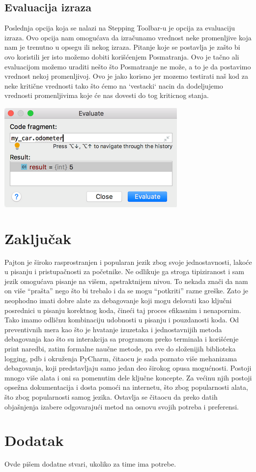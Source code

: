 \documentclass[a4paper]{article}
\begin{document}
\subsection{Evaluacija izraza}
Poslednja opcija koja se nalazi na Stepping Toolbar-u je opcija za evaluaciju izraza. Ovo opcija nam omogućava da izračunamo vrednost neke promenljive koja nam je trenutno u opsegu ili nekog izraza\cite{pyCharm}. Pitanje koje se postavlja je zašto bi ovo koristili jer isto možemo dobiti korišćenjem Posmatranja. Ovo je tačno ali evaluacijom možemo uraditi nešto što Posmatranje ne može, a to je da postavimo vrednost nekoj promenljivoj\cite{pyCharm}. Ovo je jako korisno jer mozemo testirati naš kod za neke kritične vrednosti tako što ćemo na `vestacki` nacin da dodeljujemo vrednosti promenljivima koje će nas dovesti do tog kriticnog stanja.

\includegraphics[scale = 0.4]{4}
\section{Zaključak}
\label{sec:zakljucak}

Pajton je široko rasprostranjen i popularan jezik zbog svoje jednostavnosti, lakoće u pisanju i pristupačnosti za početnike. Ne odlikuje ga stroga tipiziranost i sam jezik omogućava pisanje na višem, apstraktnijem nivou. To nekada znači da nam on više “prašta” nego što bi trebalo i da se mogu “potkriti” razne greške. Zato je neophodno imati dobre alate za debagovanje koji mogu delovati kao ključni posrednici u pisanju korektnog koda, čineći taj proces efikasnim i nenapornim. Tako imamo odličnu kombinaciju udobnosti u pisanju i pouzdanosti koda. Od preventivnih mera kao što je hvatanje izuzetaka i jednostavnijih metoda debagovanja kao što su interakcija sa programom preko terminala i korišćenje print naredbi, zatim formalne naučne metode, pa sve do složenijih biblioteka logging, pdb i okruženja PyCharm, čitaocu je sada poznato više mehanizama debagovanja, koji predstavljaju samo jedan deo širokog opusa mogućnosti. Postoji mnogo više alata i oni sa pomenutim dele ključne koncepte. Za većinu njih postoji opsežna dokumentacija i dosta pomoći na internetu, što zbog popularnosti alata, što zbog popularnosti samog jezika. Ostavlja se čitaocu da preko datih objašnjenja izabere odgovarajući metod na osnovu svojih potreba i preferensi.


\appendix
 


\newpage

\appendix
\section{Dodatak}
Ovde pišem dodatne stvari, ukoliko za time ima potrebe.
\end{document}
